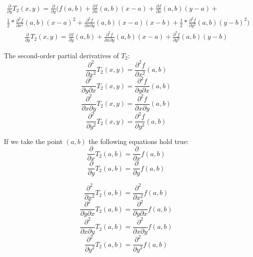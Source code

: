 \documentclass[a4paper,12pt]{article}
\begin{document}
\begin{multline*} %
\frac{\partial }{\partial y} T_{2}(x,y)=  
    \frac{\partial }{\partial y} 
    (
    f(a, b) + 
	\frac{\partial f}{\partial x}(a, b)(x - a) + 
	\frac{\partial f}{\partial x}(a, b)(y - a) + \\
	\frac{1}{2} * \frac{\partial^2 f}{\partial x^2}(a, b)(x - a)^2 +
	\frac{\partial^2 f}{\partial x\partial y}(a, b)(x - a)(x - b) +
	\frac{1}{2} * \frac{\partial^2 f}{\partial y^2}(a, b)(y - b)^2 
	)
\end{multline*}
\begin{multline*}
\frac{\partial }{\partial y} T_{2}(x,y) =  
    \frac{\partial f}{\partial y}(a, b) + 
    \frac{\partial^2 f}{\partial x\partial y}(a, b)(x - a) +
	\frac{\partial^2 f}{\partial y^2}(a, b)(y - b)
\end{multline*}
\newline

The second-order partial derivatives of $T_{2}$:
\begin{equation*}
\frac{\partial^2 }{\partial x^2} T_{2}(x,y) =  
\frac{\partial^2 f}{\partial x^2}(a, b)
\end{equation*}
\begin{equation*}
\frac{\partial^2 }{\partial y \partial x} T_{2}(x,y) =  
\frac{\partial^2 f}{\partial y \partial x}(a, b)
\end{equation*}
\begin{equation*}
\frac{\partial^2 }{\partial x \partial y} T_{2}(x,y) =  
\frac{\partial^2 f}{\partial x \partial y}(a, b)
\end{equation*}
\begin{equation*}
\frac{\partial^2 }{\partial y^2} T_{2}(x,y) =  
\frac{\partial^2 f}{\partial y^2}(a, b)
\end{equation*}

If we take the point $(a, b)$ the following equations hold true:
\begin{equation*}
\frac{\partial }{\partial x} T_{2}(a,b) =
 \frac{\partial }{\partial x} f(a, b)
\end{equation*}
\begin{equation*}
\frac{\partial }{\partial y} T_{2}(a,b) =
 \frac{\partial }{\partial y} f(a, b)
\end{equation*}

\begin{equation*}
\frac{\partial^2 }{\partial x^2} T_{2}(a,b) =
\frac{\partial^2 }{\partial x^2} f(a, b)
\end{equation*}
\begin{equation*}
\frac{\partial^2 }{\partial y \partial x} T_{2}(a,b) =
\frac{\partial^2 }{\partial y \partial x} f(a, b)
\end{equation*}
\begin{equation*}
\frac{\partial^2 }{\partial x \partial y} T_{2}(a,b) =
\frac{\partial^2 }{\partial x \partial y} f(a, b)
\end{equation*}
\begin{equation*}
\frac{\partial^2 }{\partial y^2} T_{2}(a,b) =
\frac{\partial^2 }{\partial y^2} f(a, b)
\end{equation*}
\end{document}
